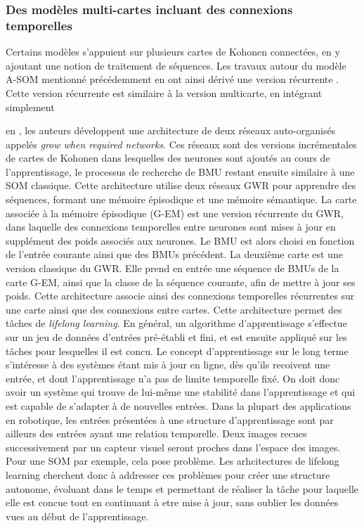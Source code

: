 \documentclass[../main]{subfiles}
\begin{document}
\subsubsection{Des modèles multi-cartes incluant des connexions temporelles}

Certains modèles s'appuient sur plusieurs cartes de Kohonen connectées, en y ajoutant une notion de traitement de séquences.
Les travaux autour du modèle A-SOM mentionné précédemment en ont ainsi dérivé une version récurrente \cite{Buonamente2015DiscriminatingAS}. Cette version récurrente est similaire à la version multicarte, en intégrant simplement 


en \cite{parisiLL}, les auteurs développent une architecture de deux réseaux auto-organisés appelés \emph{grow when required networks}. Ces réseaux sont des versions incrémentales de cartes de Kohonen dans lesquelles des neurones sont ajoutés au cours de l'apprentissage, le processus de recherche de BMU restant ensuite similaire à une SOM classique.
Cette architecture utilise deux réseaux GWR pour apprendre des séquences, formant une mémoire épisodique et une mémoire sémantique.
La carte associée à la mémoire épisodique (G-EM) est une version récurrente du GWR, dans laquelle des connexions temporelles entre neurones sont mises à jour en supplément des poids associés aux neurones. Le BMU est alors choisi en fonction de l'entrée courante ainsi que des BMUs précédent. 
La deuxième carte est une version classique du GWR. Elle prend en entrée une séquence de BMUs de la carte G-EM, ainsi que la classe de la séquence courante, afin de mettre à jour ses poids. 
Cette architecture associe ainsi des connexions temporelles récurrentes sur une carte ainsi que des connexions entre cartes.
Cette architecture permet des tâches de \emph{lifelong learning}. En général, un algorithme d'apprentissage s'effectue sur un jeu de données d'entrées pré-établi et fini, et est ensuite appliqué sur les tâches pour lesquelles il est concu.
Le concept d'apprentissage sur le long terme s'intéresse à des systèmes étant mis à jour en ligne, dès qu'ils recoivent une entrée, et dont l'apprentissage n'a pas de limite temporelle fixé. On doit donc avoir un système qui trouve de lui-même une stabilité dans l'apprentissage et qui est capable de s'adapter à de nouvelles entrées.
Dans la plupart des applications en robotique, les entrées présentées à une structure d'apprentissage sont par ailleurs des entrées ayant une relation temporelle. Deux images recues successivement par un capteur visuel seront proches dans l'espace des images. Pour une SOM par exemple, cela pose problème. Les arhcitectures de lifelong learning cherchent donc à addresser ces problèmes pour créer une structure autonome, évoluant dans le temps et permettant de réaliser la tâche pour laquelle elle est concue tout en continuant à etre mise à jour, sans oublier les données vues au début de l'apprentissage.
\end{document}
